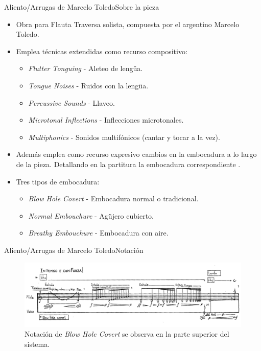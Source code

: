 \documentclass[aspectratio=169]{beamer}
\begin{document}
\begin{frame}{Aliento/Arrugas de Marcelo Toledo}{Sobre la pieza}
  \begin{itemize}
  \item {
    Obra para Flauta Traversa solista, compuesta por el argentino Marcelo Toledo.
  }
  \item {   
    Emplea técnicas extendidas como recurso compositivo:
    \begin{itemize}
    	\item \textit{Flutter Tonguing} - Aleteo de lengüa.
     	\item \textit{Tongue Noises} - Ruidos con la lengüa.
     	\item \textit{Percussive Sounds} - Llaveo.
     	\item \textit{Microtonal Inflections} - Inflecciones microtonales.
     	\item \textit{Multiphonics} - Sonidos multifónicos (cantar y tocar a la vez).
    \end{itemize}
  }
  \item {
    Además emplea como recurso expresivo cambios en la embocadura a lo largo de la pieza. Detallando en la partitura la embocadura correspondiente .
  }
  \item {   
    Tres tipos de embocadura:
    \begin{itemize}
    	\item \textit{Blow Hole Covert} - Embocadura normal o tradicional.
     	\item \textit{Normal Embouchure} - Agüjero cubierto.
     	\item \textit{Breathy Embouchure} - Embocadura con aire.
    \end{itemize}
  }
  \end{itemize}
\end{frame}
 
\begin{frame}{Aliento/Arrugas de Marcelo Toledo}{Notación}
\begin{figure}[H]
\begin{center}
\includegraphics[width=1\textwidth]{bhc}
\caption{Notación de \textit{Blow Hole Covert} se observa en la parte superior del sistema.}
\end{center}
\end{figure}
\end{frame}
\end{document}
